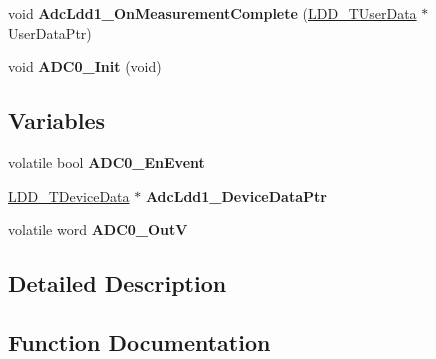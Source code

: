 \begin{DoxyCompactItemize}
\mbox{\label{group___a_d_c0__module_ga4776d32af94d7918f74bc7377ae5351f}} 
void {\bfseries Adc\+Ldd1\+\_\+\+On\+Measurement\+Complete} (\hyperlink{group___p_e___types__module_ga0b66a73f87238a782318aa0be7578e35}{L\+D\+D\+\_\+\+T\+User\+Data} $\ast$User\+Data\+Ptr)
\item 
\mbox{\label{group___a_d_c0__module_ga690f4c62cab35ab8f427e688d96a610e}} 
void {\bfseries A\+D\+C0\+\_\+\+Init} (void)
\end{DoxyCompactItemize}
\subsection*{Variables}
\begin{DoxyCompactItemize}
\item 
\mbox{\label{group___a_d_c0__module_ga21f464754ab63275ca0c0faba02256cd}} 
volatile bool {\bfseries A\+D\+C0\+\_\+\+En\+Event}
\item 
\mbox{\label{group___a_d_c0__module_ga6a1ba182ca9bc85d625f7019e5dc2c65}} 
\hyperlink{group___p_e___types__module_gac5cf1362f1f0e3a2ce71b1bf2276d091}{L\+D\+D\+\_\+\+T\+Device\+Data} $\ast$ {\bfseries Adc\+Ldd1\+\_\+\+Device\+Data\+Ptr}
\item 
\mbox{\label{group___a_d_c0__module_gafcb8049bd0549144751bf1704811a2a7}} 
volatile word {\bfseries A\+D\+C0\+\_\+\+OutV}
\end{DoxyCompactItemize}


\subsection{Detailed Description}


\subsection{Function Documentation}
\mbox{\label{group___a_d_c0__module_gae338cdea1f89e3ae9bcac5801ebadcf8}} 
